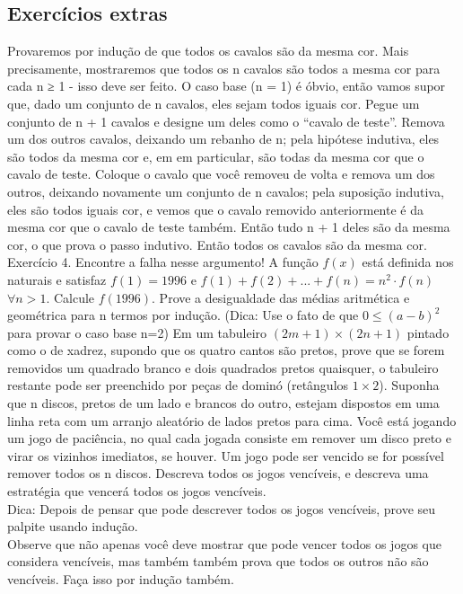\subsection{Exercícios extras}
\begin{questions}
\question Provaremos
por indução de que todos os cavalos são da mesma cor. Mais precisamente, mostraremos que todos os n cavalos são todos
a mesma cor para cada n ≥ 1 - isso deve ser feito.
O caso base (n = 1) é óbvio, então vamos supor que, dado um conjunto de n cavalos, eles sejam todos iguais
cor. Pegue um conjunto de n + 1 cavalos e designe um deles como o “cavalo de teste”. Remova um dos
outros cavalos, deixando um rebanho de n; pela hipótese indutiva, eles são todos da mesma cor e, em
em particular, são todas da mesma cor que o cavalo de teste. Coloque o cavalo que você removeu de volta e remova
um dos outros, deixando novamente um conjunto de n cavalos; pela suposição indutiva, eles são todos iguais
cor, e vemos que o cavalo removido anteriormente é da mesma cor que o cavalo de teste também. Então tudo
n + 1 deles são da mesma cor, o que prova o passo indutivo. Então todos os cavalos são da mesma cor.
Exercício 4. Encontre a falha nesse argumento!
\question A função $f(x)$ está definida nos naturais e satisfaz $f(1)=1996$ e $f(1)+f(2)+...+f(n)=n^2 \cdot f(n)$ $\forall n>1$. Calcule $f(1996)$.
\question Prove a desigualdade das médias aritmética e geométrica para n termos por indução. (Dica: Use o fato de que $0 \leq (a-b)^2$ para provar o caso base n=2)
\question Em um tabuleiro $(2m+1) \times (2n+1)$ pintado como o de xadrez, supondo que os quatro cantos são pretos, prove que se forem removidos um quadrado branco e dois quadrados pretos quaisquer, o tabuleiro restante pode ser preenchido por peças de dominó (retângulos $1 \times 2$). 
\question Suponha que n discos, pretos de um lado e brancos do outro, estejam dispostos em uma linha reta com
um arranjo aleatório de lados pretos para cima. Você está jogando um jogo de paciência, no qual cada jogada
consiste em remover um disco preto e virar os vizinhos imediatos, se houver. Um jogo pode ser vencido se for possível remover todos os n discos. Descreva todos os jogos vencíveis,
e descreva uma estratégia que vencerá todos os jogos vencíveis. \\
Dica: Depois de pensar que pode descrever todos os jogos vencíveis, prove seu palpite usando indução.\\
Observe que não apenas você deve mostrar que pode vencer todos os jogos que considera vencíveis, mas também
também prova que todos os outros não são vencíveis. Faça isso por indução também.
\end{questions}

